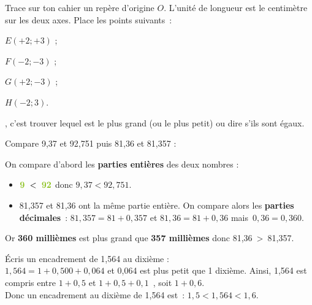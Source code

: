 \begin{methode*1}
\exercice Trace sur ton cahier un repère d'origine $O$. L'unité de longueur est le centimètre sur les deux axes. Place les points suivants :
\begin{colenumerate}{4}
 \item $E(+ 2 ; + 3)$ ;
 \item $F(- 2 ; - 3)$ ;
 \item $G(+ 2 ; - 3)$ ;
 \item $H(- 2 ; 3)$.
 \end{colenumerate}

\end{methode*1}



\begin{methode*1}

\begin{aconnaitre}
, c'est trouver lequel est le plus grand (ou le plus petit) ou dire s'ils sont égaux.
\end{aconnaitre}

\begin{exemple*1}
Compare 9,37 et 92,751 puis 81,36 et 81,357 :

On compare d'abord les \textbf{\textcolor{H1}{parties entières}} des deux nombres :
\begin{itemize}
 \item $\textbf{\textcolor{H1}{9}} < \textbf{\textcolor{H1}{92}}$ donc $9,37 < 92,751$.
 \item 81,357 et 81,36 ont la même partie entière. On compare alors les \textbf{\textcolor{B2}{parties décimales}} : $81,357 = 81 + 0,357$ et $81,36 = 81 + 0,36$ mais $0,36 = 0,360$.
 \end{itemize}
Or \textbf{\textcolor{B2}{360 millièmes}} est plus grand que \textbf{\textcolor{B2}{357 millièmes}} donc 81,36 > 81,357.
\end{exemple*1}


\begin{exemple*1}
Écris un encadrement de 1,564 au dixième : \\[0.5em]
$1,564 = 1+ 0,500 + 0,064$ et 0,064 est plus petit que 1 dixième. Ainsi, 1,564 est compris entre $1 + 0,5$ et $1 + 0,5 + 0,1$ , soit $1 + 0,6$. \\[0.5em]
Donc un encadrement au dixième de 1,564 est : $1,5 < 1,564 < 1,6$.
\end{exemple*1}


\end{methode*1}

